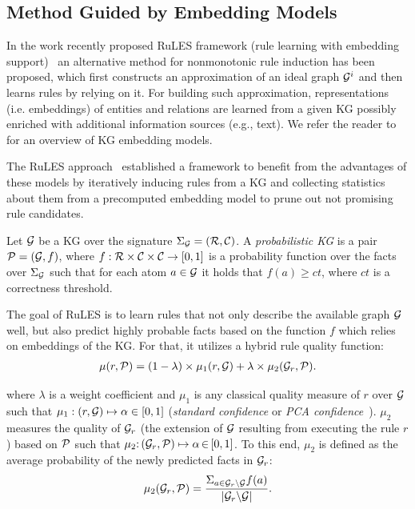 \subsection{Method Guided by Embedding Models}



In the work recently proposed RuLES framework (rule learning with embedding support)~\cite{thinh2018} an alternative method for nonmonotonic rule induction has been proposed, which first constructs an approximation of an ideal graph $\mathcal{G}^i$ and then learns rules by relying on it. For building such approximation, representations (i.e. embeddings) of entities and relations are learned from a given KG possibly enriched with additional information sources (e.g., text). We refer the reader to \cite{Wang2017} for an overview of KG embedding models. %

The RuLES approach~\cite{thinh2018} established a framework to benefit from the advantages of these models %
by iteratively inducing rules from a KG and collecting statistics about them from a precomputed embedding model to prune out not promising rule candidates.

Let  $\mathcal{G}$ be a KG over the signature $\Sigma_{\mathcal{G}}=(\mathcal{R},\mathcal{C})$.
A \emph{probabilistic KG} is a pair $\mathcal{P} = (\mathcal{G},f)$, 
where $f:\mathcal{R}\times \mathcal{C} \times \mathcal{C}\rightarrow [0,1]$ is a probability function over the facts over $\Sigma_{\mathcal{G}}$ such that for each atom $a \in \mathcal{G} $ it holds that $f(a) \geq ct $, where $ct$ is a correctness threshold.

The goal of RuLES is to learn rules that not only describe the available graph $\mathcal{G}$ well, but also predict highly probable facts based on the function $f$ which relies on embeddings of the KG. For that, it utilizes a hybrid rule quality function:
\begin{align*}
	\mu(r,\mathcal{P})= (1 - \lambda)\times \mu_1(r,\mathcal{G}) + \lambda \times \mu_2(\mathcal{G}_r,\mathcal{P}).
\end{align*}

\noindent where $\lambda$ is a weight coefficient and $\mu_1$ is any classical quality measure of $r$ over $\mathcal{G}$ such that $\mu_1: (r,\mathcal{G}) \mapsto \alpha \in  [0,1]$ (\eg \textit{standard confidence} or \textit{PCA confidence}~\cite{amie}). 
$\mu_2$ measures the quality of $\mathcal{G}_r$ (\ie the extension of $\mathcal{G}$ resulting from executing the rule $r$) based on $\mathcal{P}$ such that
 $\mu_2{:}\, (\mathcal{G}_r,\mathcal{P}) \mapsto  \alpha \,{\in}\, [0,1]$. To this end, $\mu_2$ is defined as the average probability of the newly predicted facts in $\mathcal{G}_r$: %
\begin{align*}
	\mu_2(\mathcal{G}_r,\mathcal{P}) = \dfrac{\Sigma_{a\in \mathcal{G}_r\backslash \mathcal{G}} f(a)}{|\mathcal{G}_r \backslash \mathcal{G}|}.
\end{align*}


